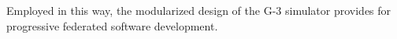 \documentclass[12pt]{article}
\begin{document}
Employed in this way, the modularized design of the G-3 simulator
provides for progressive federated software development.



\cleardoublepage
{}

%
%


\end{document}
